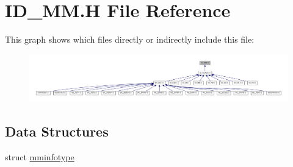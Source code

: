 \hypertarget{ID__MM_8H}{
\section{ID\_\-MM.H File Reference}
\label{ID__MM_8H}
}
This graph shows which files directly or indirectly include this file:
\nopagebreak
\begin{figure}[H]
\begin{center}
\leavevmode
\includegraphics[width=400pt]{ID__MM_8H__dep__incl}
\end{center}
\end{figure}
\subsection*{Data Structures}
\begin{DoxyCompactItemize}
\item 
struct \hyperlink{structmminfotype}{mminfotype}
\end{DoxyCompactItemize}
